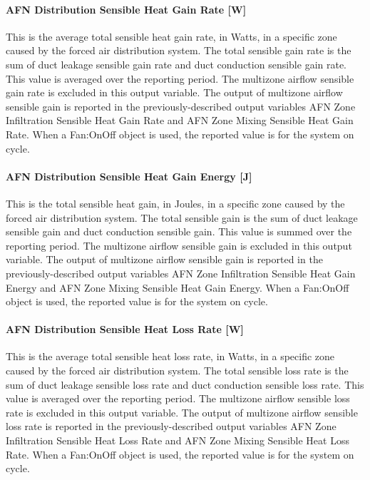 \paragraph{AFN Distribution Sensible Heat Gain Rate {[}W{]}}\label{afn-distribution-sensible-heat-gain-rate-w}

This is the average total sensible heat gain rate, in Watts, in a specific zone caused by the forced air distribution system. The total sensible gain rate is the sum of duct leakage sensible gain rate and duct conduction sensible gain rate. This value is averaged over the reporting period. The multizone airflow sensible gain rate is excluded in this output variable. The output of multizone airflow sensible gain is reported in the previously-described output variables AFN Zone Infiltration Sensible Heat Gain Rate and AFN Zone Mixing Sensible Heat Gain Rate. When a Fan:OnOff object is used, the reported value is for the system on cycle.

\paragraph{AFN Distribution Sensible Heat Gain Energy {[}J{]}}\label{afn-distribution-sensible-heat-gain-energy-j}

This is the total sensible heat gain, in Joules, in a specific zone caused by the forced air distribution system. The total sensible gain is the sum of duct leakage sensible gain and duct conduction sensible gain. This value is summed over the reporting period. The multizone airflow sensible gain is excluded in this output variable. The output of multizone airflow sensible gain is reported in the previously-described output variables AFN Zone Infiltration Sensible Heat Gain Energy and AFN Zone Mixing Sensible Heat Gain Energy. When a Fan:OnOff object is used, the reported value is for the system on cycle.

\paragraph{AFN Distribution Sensible Heat Loss Rate {[}W{]}}\label{afn-distribution-sensible-heat-loss-rate-w}

This is the average total sensible heat loss rate, in Watts, in a specific zone caused by the forced air distribution system. The total sensible loss rate is the sum of duct leakage sensible loss rate and duct conduction sensible loss rate. This value is averaged over the reporting period. The multizone airflow sensible loss rate is excluded in this output variable. The output of multizone airflow sensible loss rate is reported in the previously-described output variables AFN Zone Infiltration Sensible Heat Loss Rate and AFN Zone Mixing Sensible Heat Loss Rate. When a Fan:OnOff object is used, the reported value is for the system on cycle.

